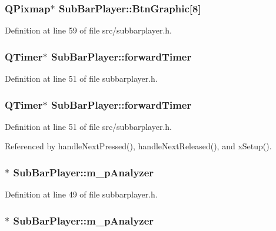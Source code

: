 \subsubsection{\setlength{\rightskip}{0pt plus 5cm}QPixmap$\ast$ {\bf Sub\-Bar\-Player::Btn\-Graphic}[8]\hspace{0.3cm}{\tt  [private]}}\label{classSubBarPlayer_SubBarPlayerr1}




Definition at line 59 of file src/subbarplayer.h.
\subsubsection{\setlength{\rightskip}{0pt plus 5cm}QTimer$\ast$ {\bf Sub\-Bar\-Player::forward\-Timer}}\label{classSubBarPlayer_SubBarPlayero12}




Definition at line 51 of file subbarplayer.h.
\subsubsection{\setlength{\rightskip}{0pt plus 5cm}QTimer$\ast$ {\bf Sub\-Bar\-Player::forward\-Timer}}\label{classSubBarPlayer_SubBarPlayero2}




Definition at line 51 of file src/subbarplayer.h.

Referenced by handle\-Next\-Pressed(), handle\-Next\-Released(), and x\-Setup().
\subsubsection{$\ast$ {\bf Sub\-Bar\-Player::m\_\-p\-Analyzer}}\label{classSubBarPlayer_SubBarPlayero10}




Definition at line 49 of file subbarplayer.h.
\subsubsection{$\ast$ {\bf Sub\-Bar\-Player::m\_\-p\-Analyzer}}\label{classSubBarPlayer_SubBarPlayero0}




